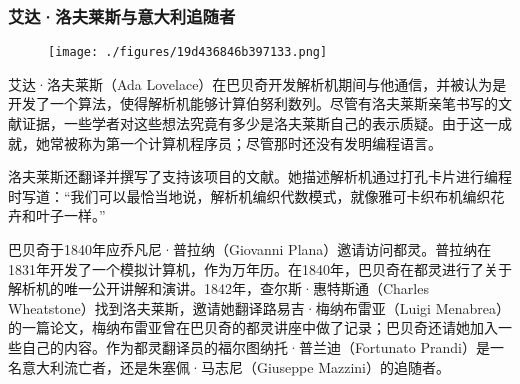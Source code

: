 \subsubsection{艾达·洛夫莱斯与意大利追随者}
\begin{figure}[ht]
\centering
\texttt{[image: ./figures/19d436846b397133.png]}
\caption{} \label{fig_CRSBQ_14}
\end{figure}
艾达·洛夫莱斯（Ada Lovelace）在巴贝奇开发解析机期间与他通信，并被认为是开发了一个算法，使得解析机能够计算伯努利数列。尽管有洛夫莱斯亲笔书写的文献证据，一些学者对这些想法究竟有多少是洛夫莱斯自己的表示质疑。由于这一成就，她常被称为第一个计算机程序员；尽管那时还没有发明编程语言。

洛夫莱斯还翻译并撰写了支持该项目的文献。她描述解析机通过打孔卡片进行编程时写道：“我们可以最恰当地说，解析机编织代数模式，就像雅可卡织布机编织花卉和叶子一样。”

巴贝奇于1840年应乔凡尼·普拉纳（Giovanni Plana）邀请访问都灵。普拉纳在1831年开发了一个模拟计算机，作为万年历。在1840年，巴贝奇在都灵进行了关于解析机的唯一公开讲解和演讲。1842年，查尔斯·惠特斯通（Charles Wheatstone）找到洛夫莱斯，邀请她翻译路易吉·梅纳布雷亚（Luigi Menabrea）的一篇论文，梅纳布雷亚曾在巴贝奇的都灵讲座中做了记录；巴贝奇还请她加入一些自己的内容。作为都灵翻译员的福尔图纳托·普兰迪（Fortunato Prandi）是一名意大利流亡者，还是朱塞佩·马志尼（Giuseppe Mazzini）的追随者。
